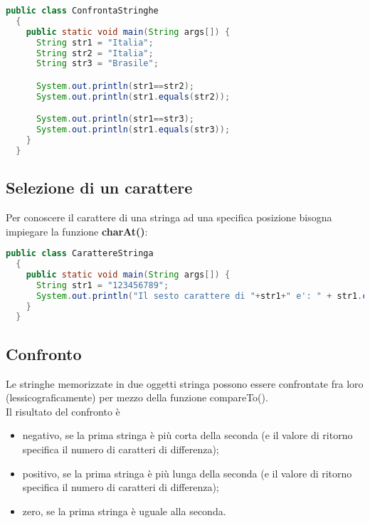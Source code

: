 \documentclass[a4paper]{extarticle}
\begin{document}
\vspace{1em}
\noindent
\begin{lstlisting}[language=Java, caption=Uguaglianza fra stringhe in Java]
  public class ConfrontaStringhe
  {
    public static void main(String args[]) {
      String str1 = "Italia";
      String str2 = "Italia";
      String str3 = "Brasile";

      System.out.println(str1==str2);
      System.out.println(str1.equals(str2));

      System.out.println(str1==str3);
      System.out.println(str1.equals(str3));
    }
  }
\end{lstlisting}

\vspace{1em}
\subsection{Selezione di un carattere}
Per conoscere il carattere di una stringa ad una specifica posizione bisogna impiegare la funzione \textbf{charAt()}:

\vspace{1em}
\noindent
\begin{lstlisting}[language=Java, caption=Uguaglianza fra stringhe in Java]
  public class CarattereStringa
  {
    public static void main(String args[]) {
      String str1 = "123456789";
      System.out.println("Il sesto carattere di "+str1+" e': " + str1.charAt(6));
    }
  }
\end{lstlisting}

\vspace{1em}
\subsection{Confronto}
Le stringhe memorizzate in due oggetti stringa possono essere confrontate fra loro (lessicograficamente) per mezzo della funzione compareTo().\\
Il risultato del confronto è
\begin{itemize}
  \item negativo, se la prima stringa è più corta della seconda (e il valore di ritorno specifica il numero di caratteri di differenza);
  \item positivo, se la prima stringa è più lunga della seconda (e il valore di ritorno specifica il numero di caratteri di differenza);
  \item zero, se la prima stringa è uguale alla seconda.
\end{itemize}
\end{document}
